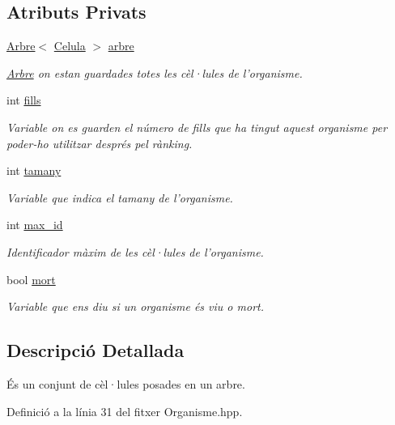 \subsection*{Atributs Privats}
\begin{DoxyCompactItemize}
\item 
\hyperlink{class_arbre}{Arbre}$<$ \hyperlink{struct_celula}{Celula} $>$ \hyperlink{class_organisme_aa6bc89f1937afd04f86e770c2bde8c69}{arbre}
\begin{DoxyCompactList}\small\item\em \hyperlink{class_arbre}{Arbre} on estan guardades totes les cèl·lules de l'organisme. \end{DoxyCompactList}\item 
int \hyperlink{class_organisme_a4644da413bb0e38f34566334ebee1c1c}{fills}
\begin{DoxyCompactList}\small\item\em Variable on es guarden el número de fills que ha tingut aquest organisme per poder-\/ho utilitzar després pel rànking. \end{DoxyCompactList}\item 
int \hyperlink{class_organisme_a5d30992b5ded1a9314aff94ce9fb3932}{tamany}
\begin{DoxyCompactList}\small\item\em Variable que indica el tamany de l'organisme. \end{DoxyCompactList}\item 
int \hyperlink{class_organisme_ae7f51a74f01cee155cf88a5b01545f78}{max\-\_\-id}
\begin{DoxyCompactList}\small\item\em Identificador màxim de les cèl·lules de l'organisme. \end{DoxyCompactList}\item 
bool \hyperlink{class_organisme_ae20564db8d9ba5b7547750375010ed7b}{mort}
\begin{DoxyCompactList}\small\item\em Variable que ens diu si un organisme és viu o mort. \end{DoxyCompactList}\end{DoxyCompactItemize}


\subsection{Descripció Detallada}
És un conjunt de cèl·lules posades en un arbre. 

Definició a la línia 31 del fitxer Organisme.\-hpp.



